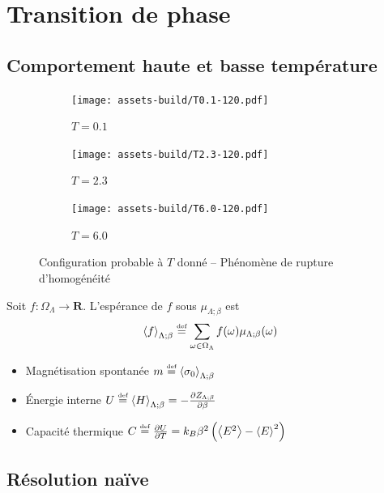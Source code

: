 \documentclass[french]{beamer}
\newcommand\eqdef{\overset{\mbox{\tiny def}}{=}}
\begin{document}
\section{Transition de phase}
\subsection{Comportement haute et basse température}
\begin{frame}

\begin{figure}
	\begin{subfigure}{0.3\textwidth}
		\texttt{[image: assets-build/T0.1-120.pdf]}
		\caption{$T= 0.1$}
	\end{subfigure}
	\begin{subfigure}{0.3\textwidth}
		\texttt{[image: assets-build/T2.3-120.pdf]}
		\caption{$T= 2.3$}
	\end{subfigure}
	\begin{subfigure}{0.3\textwidth}
		\texttt{[image: assets-build/T6.0-120.pdf]}
		\caption{$T= 6.0$}
	\end{subfigure}
	\caption{Configuration probable à $T$ donné -- Phénomène de rupture d'homogénéité}
\end{figure}

\end{frame}


\begin{frame}
\begin{definition}[Espérance]
    Soit $f : \Omega_\Lambda \to \mathbf{R}$. L'espérance de $f$ sous $\mu_{\Lambda;\beta}$ est
    \[ \left\langle f \right\rangle_{\Lambda;\beta} \eqdef \sum_{\omega \in \Omega_\Lambda} f(\omega)\mu_{\Lambda;\beta}(\omega)\]
\end{definition}

\begin{itemize}
	\item  Magnétisation spontanée $m \eqdef \left<  \sigma_0  \right>_{\Lambda;\beta}$
	\item \'Energie interne $U \eqdef \left< H \right>_{\Lambda;\beta} = - \frac{\partial Z_{\Lambda;\beta}}{\partial \beta}$
	\item Capacité thermique $C \eqdef \frac{\partial U}{\partial T} = k_B\beta^2 \left(\left<E^2\right> -  \left<E\right>^2\right)$
\end{itemize}
\end{frame}

%
\subsection{Résolution naïve}
%
\end{document}
